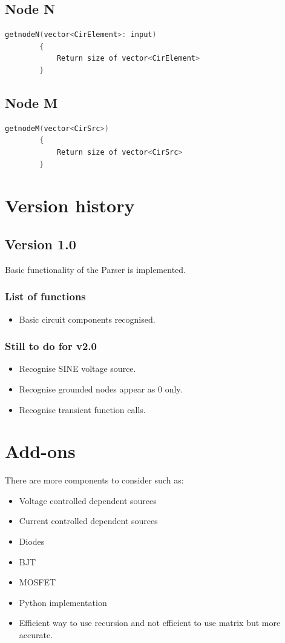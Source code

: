 \documentclass[a4paper, titlepage]{article}
\begin{document}
    \subsection{Node N}
    \begin{lstlisting}[language=C++]
        getnodeN(vector<CirElement>: input)
        {
            Return size of vector<CirElement>
        }
    \end{lstlisting}
    \subsection{Node M}
    \begin{lstlisting}[language=C++]
        getnodeM(vector<CirSrc>)
        {
            Return size of vector<CirSrc>
        }
    \end{lstlisting}
    \pagebreak
    \section{Version history}
    \subsection{Version 1.0}
    Basic functionality of the Parser is implemented.
    \subsubsection{List of functions}
    \begin{itemize}
        \item Basic circuit components recognised.
    \end{itemize}
    \subsubsection{Still to do for v2.0}
    \begin{itemize}
        \item Recognise SINE voltage source.
        \item Recognise grounded nodes appear as $0$ only.
        \item Recognise transient function calls.
    \end{itemize}

    \pagebreak
    \section{Add-ons}
    There are more components to consider such as:
    \begin{itemize}
        \item Voltage controlled dependent sources
        \item Current controlled dependent sources
        \item Diodes
        \item BJT
        \item MOSFET
        \item Python implementation
        \item Efficient way to use recursion and not efficient to use matrix but more accurate.
    \end{itemize}
    
    \pagebreak
    \printbibliography[title={References}]
\end{document}
